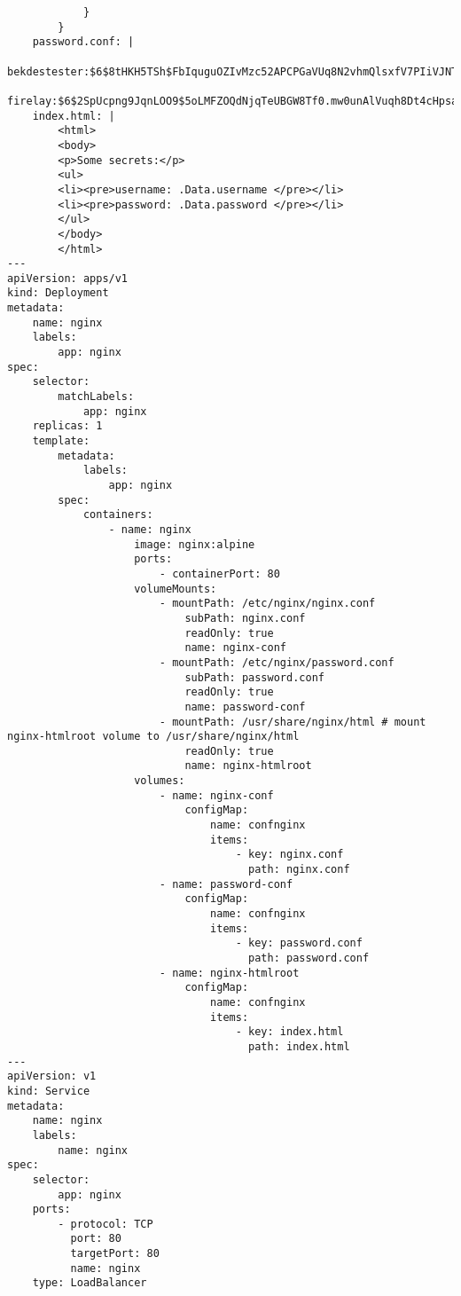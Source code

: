 \begin{lstlisting}
            }
        }
    password.conf: |
        bekdestester:$6$8tHKH5TSh$FbIquguOZIvMzc52APCPGaVUq8N2vhmQlsxfV7PIiVJNTzKWRRrkHqbFsY4DfTqHNZNcejO.dOGpgdwPzzNG80
        firelay:$6$2SpUcpng9JqnLOO9$5oLMFZOQdNjqTeUBGW8Tf0.mw0unAlVuqh8Dt4cHpsa4EzAMDTL1ylKSNErURDO3QqN0f/Gdyg5sUhYhWKYCu.
    index.html: |
        <html>
        <body>
        <p>Some secrets:</p>
        <ul>
        <li><pre>username: .Data.username </pre></li>
        <li><pre>password: .Data.password </pre></li>
        </ul>
        </body>
        </html>
---
apiVersion: apps/v1
kind: Deployment
metadata:
    name: nginx
    labels:
        app: nginx
spec:
    selector:
        matchLabels:
            app: nginx
    replicas: 1
    template:
        metadata:
            labels:
                app: nginx
        spec:
            containers:
                - name: nginx
                    image: nginx:alpine
                    ports:
                        - containerPort: 80
                    volumeMounts:
                        - mountPath: /etc/nginx/nginx.conf
                            subPath: nginx.conf
                            readOnly: true
                            name: nginx-conf
                        - mountPath: /etc/nginx/password.conf
                            subPath: password.conf
                            readOnly: true
                            name: password-conf
                        - mountPath: /usr/share/nginx/html # mount nginx-htmlroot volume to /usr/share/nginx/html
                            readOnly: true
                            name: nginx-htmlroot
                    volumes:
                        - name: nginx-conf
                            configMap:
                                name: confnginx
                                items:
                                    - key: nginx.conf
                                      path: nginx.conf
                        - name: password-conf
                            configMap:
                                name: confnginx
                                items:
                                    - key: password.conf
                                      path: password.conf
                        - name: nginx-htmlroot
                            configMap:
                                name: confnginx
                                items:
                                    - key: index.html
                                      path: index.html
---
apiVersion: v1
kind: Service
metadata:
    name: nginx
    labels:
        name: nginx
spec:
    selector:
        app: nginx
    ports:
        - protocol: TCP
          port: 80
          targetPort: 80
          name: nginx
    type: LoadBalancer
\end{lstlisting}